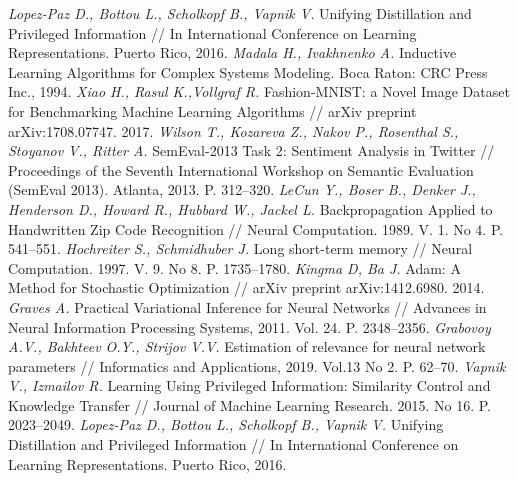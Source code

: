 \documentclass[12pt]{a&t}
\begin{document}
\begin{thebibliography}{10}
	\textit{Lopez-Paz D., Bottou L., Scholkopf B., Vapnik V.} Unifying Distillation and Privileged Information // In International Conference on Learning Representations. Puerto Rico, 2016.
	\textit{Madala H., Ivakhnenko A.} Inductive Learning Algorithms for Complex Systems Modeling. Boca Raton: CRC Press Inc., 1994.
	\textit{Xiao H., Rasul K.,Vollgraf R.} Fashion-MNIST: a Novel Image Dataset for Benchmarking Machine Learning Algorithms // arXiv preprint arXiv:1708.07747. 2017.
	\textit{Wilson T., Kozareva Z., Nakov P., Rosenthal S., Stoyanov V., Ritter A.} {S}em{E}val-2013 Task 2: Sentiment Analysis in Twitter // Proceedings of the Seventh International Workshop on Semantic Evaluation ({S}em{E}val 2013). Atlanta, 2013. P. 312--320.
	\textit{LeCun Y., Boser B., Denker J., Henderson D., Howard R., Hubbard W., Jackel L.} Backpropagation Applied to Handwritten Zip Code Recognition // Neural Computation. 1989. V. 1. No 4. P. 541--551.
	\textit{Hochreiter S., Schmidhuber J.} Long short-term memory // Neural Computation. 1997. V. 9. No 8.  P. 1735--1780.
	\textit{Kingma D, Ba J.} Adam: A Method for Stochastic Optimization // arXiv preprint arXiv:1412.6980. 2014.
	\textit{Graves A.} Practical Variational Inference for Neural Networks // Advances in Neural Information Processing Systems, 2011. Vol. 24. P. 2348--2356.
	\textit{Grabovoy A.V., Bakhteev O.Y., Strijov V.V.} Estimation of relevance for neural network parameters // Informatics and Applications, 2019. Vol.13 No 2. P. 62--70.
	\textit{Vapnik V., Izmailov R.} Learning Using Privileged Information: Similarity Control and Knowledge Transfer // Journal of Machine Learning Research. 2015. No 16. P. 2023--2049.
	\textit{Lopez-Paz D., Bottou L., Scholkopf B., Vapnik V.} Unifying Distillation and Privileged Information // In International Conference on Learning Representations. Puerto Rico, 2016.
 \end{thebibliography}
\end{document}
